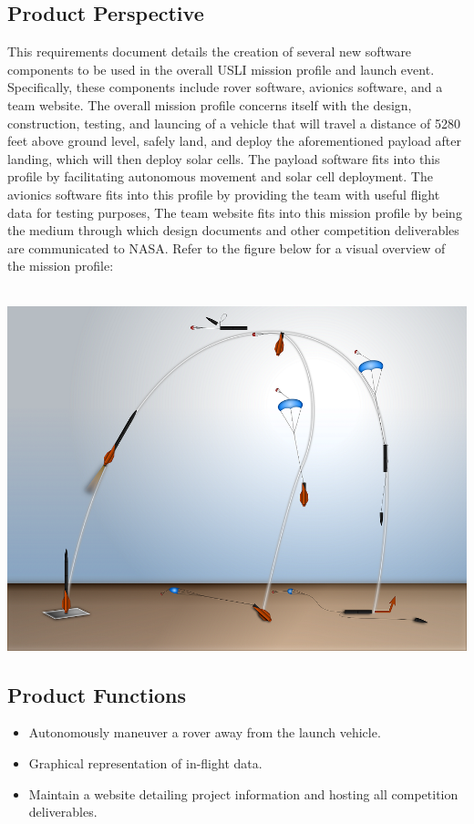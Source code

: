 \documentclass[onecolumn, draftclsnofoot, 10pt, compsoc]{IEEEtran}
\begin{document}
\subsection{Product Perspective}
This requirements document details the creation of several new software components to be used in the overall USLI mission profile and launch event. Specifically, these components include rover software, avionics software, and a team website. The overall mission profile concerns itself with the design, construction, testing, and launcing of a vehicle that will travel a distance of 5280 feet above ground level, safely land, and deploy the aforementioned payload after landing, which will then deploy solar cells. The payload software fits into this profile by facilitating autonomous movement and solar cell deployment. The avionics software fits into this profile by providing the team with useful flight data for testing purposes, The team website fits into this mission profile by being the medium through which design documents and other competition deliverables are communicated to NASA. Refer to the figure below for a visual overview of the mission profile:\\ \\
\begin{minipage}{\linewidth}
\begin{center}
\includegraphics[width=\textwidth]{mission-profile}
\end{center}
\end{minipage}

\subsection{Product Functions}
\begin{itemize} 
\item Autonomously maneuver a rover away from the launch vehicle. 
\item Graphical representation of in-flight data.
\item Maintain a website detailing project information and hosting all competition deliverables.
\end{itemize}
\end{document}
